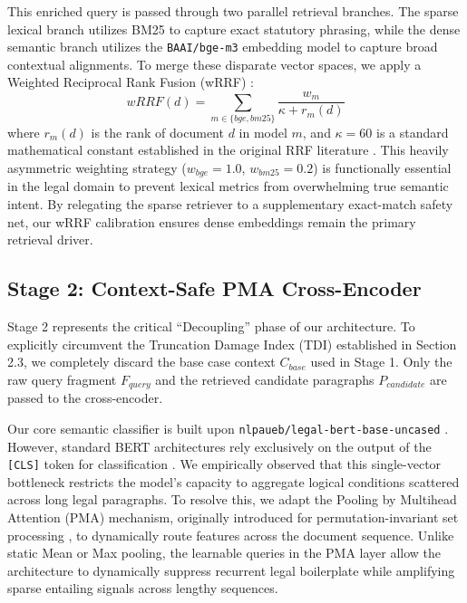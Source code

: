 \documentclass[sigconf]{acmart}
\begin{document}
This enriched query is passed through two parallel retrieval branches. The sparse lexical branch utilizes BM25 to capture exact statutory phrasing, while the dense semantic branch utilizes the \texttt{BAAI/\allowbreak bge-m3} embedding model \cite{chen2024bge} to capture broad contextual alignments. To merge these disparate vector spaces, we apply a Weighted Reciprocal Rank Fusion (wRRF) \cite{cormack2009reciprocal}:
\begin{equation}
    wRRF(d) = \sum_{m \in \{bge, bm25\}} \frac{w_m}{\kappa + r_m(d)}
\end{equation}
where $r_m(d)$ is the rank of document $d$ in model $m$, and $\kappa=60$ is a standard mathematical constant established in the original RRF literature \cite{cormack2009reciprocal}. This heavily asymmetric weighting strategy ($w_{bge}=1.0$, $w_{bm25}=0.2$) is functionally essential in the legal domain to prevent lexical metrics from overwhelming true semantic intent. By relegating the sparse retriever to a supplementary exact-match safety net, our wRRF calibration ensures dense embeddings remain the primary retrieval driver.

\subsection{Stage 2: Context-Safe PMA Cross-Encoder}

Stage 2 represents the critical ``Decoupling'' phase of our architecture. To explicitly circumvent the Truncation Damage Index (TDI) established in Section 2.3, we completely discard the base case context $C_{base}$ used in Stage 1. Only the raw query fragment $F_{query}$ and the retrieved candidate paragraphs $P_{candidate}$ are passed to the cross-encoder. 

Our core semantic classifier is built upon \texttt{nlpaueb/\allowbreak legal-bert-\allowbreak base-uncased} \cite{chalkidis2020legal}. However, standard BERT architectures rely exclusively on the output of the \texttt{[CLS]} token for classification \cite{reimers2019sentence}. We empirically observed that this single-vector bottleneck restricts the model's capacity to aggregate logical conditions scattered across long legal paragraphs. To resolve this, we adapt the Pooling by Multihead Attention (PMA) mechanism, originally introduced for permutation-invariant set processing \cite{lee2019set}, to dynamically route features across the document sequence. Unlike static Mean or Max pooling, the learnable queries in the PMA layer allow the architecture to dynamically suppress recurrent legal boilerplate while amplifying sparse entailing signals across lengthy sequences.
\end{document}
